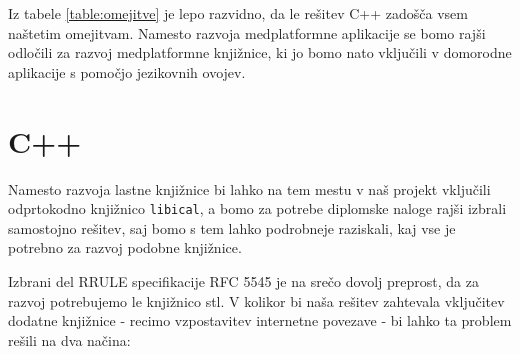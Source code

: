 Iz tabele \ref{table:omejitve} je lepo razvidno, da le rešitev C++ zadošča vsem naštetim omejitvam. Namesto razvoja medplatformne aplikacije se bomo rajši odločili za razvoj medplatformne knjižnice, ki jo bomo nato vključili v domorodne aplikacije s pomočjo jezikovnih ovojev.

\begin{table}
\footnotesize
{}
\caption{Pregled funkcionalnosti predstavljenih metod.}
\label{table:omejitve}
\end{table}

\section{C++}

Namesto razvoja lastne knjižnice bi lahko na tem mestu v naš projekt vključili odprtokodno knjižnico \texttt{libical}\cite{libical}, a bomo za potrebe diplomske naloge rajši izbrali samostojno rešitev, saj bomo s tem lahko podrobneje raziskali, kaj vse je potrebno za razvoj podobne knjižnice.

Izbrani del RRULE specifikacije RFC 5545 je na srečo dovolj preprost, da za razvoj potrebujemo le knjižnico \gls{stl}. V kolikor bi naša rešitev zahtevala vključitev dodatne knjižnice - recimo vzpostavitev internetne povezave - bi lahko ta problem rešili na dva načina:


